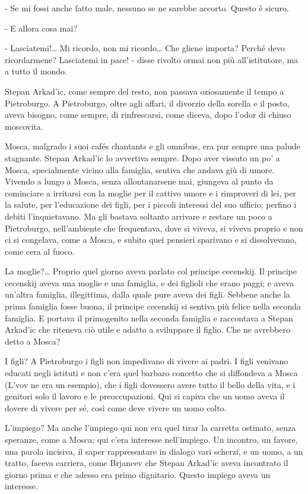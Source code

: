 - Se mi fossi anche fatto male, nessuno se ne sarebbe accorto. Questo è sicuro. 

- E allora cosa mai? 

- Lasciatemi!\ldots{} Mi ricordo, non mi ricordo\ldots{} Che gliene importa? Perché devo ricordarmene? Lasciatemi in pace! - disse rivolto ormai non più all'istitutore, ma a tutto il mondo. 

\label{xx-6} 

Stepan Arkad'ic, come sempre del resto, non passava oziosamente il tempo a Pietroburgo. A Pietroburgo, oltre agli affari, il divorzio della sorella e il posto, aveva bisogno, come sempre, di rinfrescarsi, come diceva, dopo l'odor di chiuso moscovita. 

Mosca, malgrado i suoi cafés chantants e gli omnibus, era pur sempre una palude stagnante. Stepan Arkad'ic lo avvertiva sempre. Dopo aver vissuto un po' a Mosca, specialmente vicino alla famiglia, sentiva che andava giù di umore. Vivendo a lungo a Mosca, senza allontanarsene mai, giungeva al punto da cominciare a irritarsi con la moglie per il cattivo umore e i rimproveri di lei, per la salute, per l'educazione dei figli, per i piccoli interessi del suo ufficio; perfino i debiti l'inquietavano. Ma gli bastava soltanto arrivare e restare un poco a Pietroburgo, nell'ambiente che frequentava, dove si viveva, si viveva proprio e non ci si congelava, come a Mosca, e subito quei pensieri sparivano e si dissolvevano, come cera al fuoco. 

La moglie?\ldots{} Proprio quel giorno aveva parlato col principe cecenskij. Il principe cecenskij aveva una moglie e una famiglia, e dei figlioli che erano paggi; e aveva un'altra famiglia, illegittima, dalla quale pure aveva dei figli. Sebbene anche la prima famiglia fosse buona, il principe cecenskij si sentiva più felice nella seconda famiglia. E portava il primogenito nella seconda famiglia e raccontava a Stepan Arkad'ic che riteneva ciò utile e adatto a sviluppare il figlio. Che ne avrebbero detto a Mosca? 

I figli? A Pietroburgo i figli non impedivano di vivere ai padri. I figli venivano educati negli istituti e non c'era quel barbaro concetto che si diffondeva a Mosca (L'vov ne era un esempio), che i figli dovessero avere tutto il bello della vita, e i genitori solo il lavoro e le preoccupazioni. Qui si capiva che un uomo aveva il dovere di vivere per sé, così come deve vivere un uomo colto. 

L'impiego? Ma anche l'impiego qui non era quel tirar la carretta ostinato, senza speranze, come a Mosca; qui c'era interesse nell'impiego. Un incontro, un favore, una parola incisiva, il saper rappresentare in dialogo vari scherzi, e un uomo, a un tratto, faceva carriera, come Brjancev che Stepan Arkad'ic aveva incontrato il giorno prima e che adesso era primo dignitario. Questo impiego aveva un interesse. 

